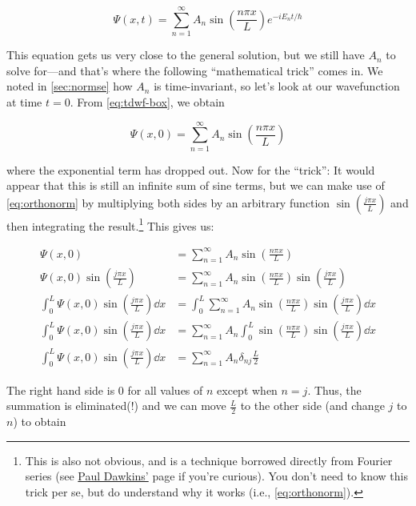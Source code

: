 \begin{equation}
	\Psi(x,t) = \sum_{n=1}^{\infty} A_n \sin \left(\frac{n\pi x}{L}\right) e^{-iE_nt/\hbar} \label{eq:tdwf-box}
\end{equation}

This equation gets us very close to the general solution, but we still have $A_n$ to solve for---and that's where the following ``mathematical trick'' comes in. 
We noted in \autoref{sec:normse} how $A_n$ is time-invariant, so let's look at our wavefunction at time $t = 0$. 
From \autoref{eq:tdwf-box}, we obtain

\begin{equation*}
	\Psi(x,0) = \sum_{n=1}^{\infty} A_n \sin \left(\frac{n\pi x}{L} \right)
\end{equation*}

\noindent where the exponential term has dropped out. 
Now for the ``trick'': It would appear that this is still an infinite sum of sine terms, but we can make use of \autoref{eq:orthonorm} by multiplying both sides by an arbitrary function $\sin \left(\frac{j\pi x}{L}\right)$ and then integrating the result.\footnote{This is also not obvious, and is a technique borrowed directly from Fourier series (see \href{http://tutorial.math.lamar.edu/Classes/DE/FourierSeries.aspx}{Paul Dawkins'} page if you're curious). You don't need to know this trick per se, but do understand why it works (i.e., \autoref{eq:orthonorm}).} 
This gives us:

\begin{align*}
	\Psi(x,0) &= \sum_{n=1}^{\infty} A_n \sin \left(\frac{n\pi x}{L} \right) \\
	\Psi(x,0) \sin \left(\frac{j \pi x}{L}\right) &= \sum_{n=1}^{\infty} A_n \sin \left(\frac{n\pi x}{L} \right) \sin \left( \frac{j \pi x}{L}\right) \\
	\int_0^L \Psi(x,0) \sin \left(\frac{j \pi x}{L}\right) \dd{x} &= \int_0^L \sum_{n=1}^{\infty} A_n \sin \left(\frac{n\pi x}{L} \right) \sin \left( \frac{j \pi x}{L}\right) \dd{x} \\
	\int_0^L \Psi(x,0) \sin \left(\frac{j \pi x}{L}\right) \dd{x} &= \sum_{n=1}^{\infty} A_n \int_0^L \sin \left(\frac{n\pi x}{L} \right) \sin \left( \frac{j \pi x}{L}\right) \dd{x} \\
	\int_0^L \Psi(x,0) \sin \left(\frac{j \pi x}{L}\right) \dd{x} &= \sum_{n=1}^{\infty} A_n \delta_{nj} \frac{L}{2}
\end{align*}

The right hand side is 0 for all values of $n$ except when $n = j$. 
Thus, the summation is eliminated(!) and we can move $\frac{L}{2}$ to the other side (and change $j$ to $n$) to obtain

